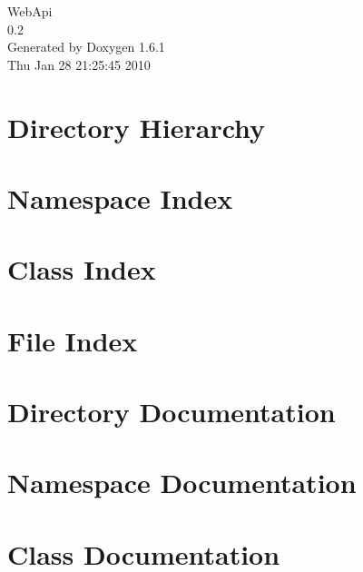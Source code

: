 \documentclass[a4paper]{book}
\begin{document}
\hypersetup{pageanchor=false}
\begin{titlepage}
\vspace*{7cm}
\begin{center}
{\Large WebApi \\[1ex]\large 0.2 }\\
\vspace*{1cm}
{\large Generated by Doxygen 1.6.1}\\
\vspace*{0.5cm}
{\small Thu Jan 28 21:25:45 2010}\\
\end{center}
\end{titlepage}
\clearemptydoublepage
{}
\tableofcontents
\clearemptydoublepage
{}
\hypersetup{pageanchor=true}
\chapter{Directory Hierarchy}

\chapter{Namespace Index}

\chapter{Class Index}

\chapter{File Index}

\chapter{Directory Documentation}




\chapter{Namespace Documentation}

\chapter{Class Documentation}












\end{document}
